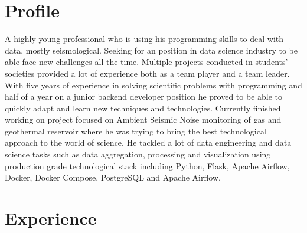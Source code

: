 \documentclass[11pt,a4paper,sans]{moderncv}
\begin{document}
\makecvtitle
\vspace{-0.9cm}


\section{Profile}
	A highly young professional who is using his programming skills to deal with data, mostly seismological.
	Seeking for an position in data science industry to be able face new challenges all the time.
	Multiple projects conducted in students' societies provided a lot of experience both as a team player and a team leader.
	With five years of experience in solving scientific problems with programming and half of a year on a junior backend developer position he proved to be able to quickly adapt and learn new techniques and technologies.
	Currently finished working on project focused on Ambient Seismic Noise monitoring of gas and geothermal reservoir where he was trying to bring the best technological approach to the world of science. 
	He tackled a lot of data engineering and data science tasks such as data aggregation, processing and visualization using production grade technological stack including Python, Flask, Apache Airflow, Docker, Docker Compose, PostgreSQL and Apache Airflow. 

\section{Experience}
	\vspace{-0.1cm}
	\vspace{-0.1cm}

	\vspace{-0.1cm}
	\vspace{-0.1cm}
\end{document}
